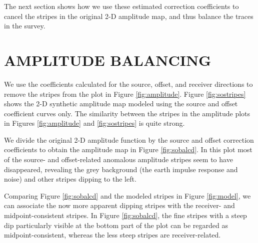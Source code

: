 



\par
The next section shows how we use these estimated correction coefficients to 
cancel the stripes in the original 2-D amplitude map, and thus balance the 
traces in the survey.


\section{AMPLITUDE BALANCING}
\par
We use the coefficients calculated for the source, offset, and receiver
directions to remove the stripes from the plot in Figure \ref{fig:amplitude}.
Figure \ref{fig:sostripes} shows the 2-D synthetic amplitude map modeled using
the source and offset coefficient curves only. The similarity between the
stripes in the amplitude plots in Figures \ref{fig:amplitude} and \ref{fig:sostripes} 
is quite strong.


\par
We divide the original 2-D amplitude function by the source and offset 
correction coefficients to obtain the amplitude map in Figure \ref{fig:sobalcd}.
In this plot most of the source- and offset-related anomalous amplitude 
stripes seem to have disappeared, revealing the grey background (the earth 
impulse response and noise) and other stripes dipping to the left.


\par
Comparing Figure \ref{fig:sobalcd} and the modeled stripes in Figure \ref{fig:model}, 
we can associate the now more apparent dipping stripes with the receiver- and 
midpoint-consistent stripes. In Figure \ref{fig:sobalcd}, the fine stripes with 
a steep dip particularly visible at the bottom part of the plot can be
regarded as midpoint-consistent, whereas the less steep stripes are 
receiver-related.

